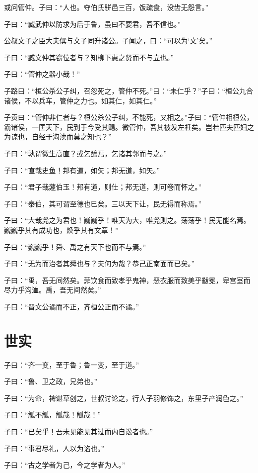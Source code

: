 \documentclass[a5paper]{ctexbook}
\begin{document}
    或问管仲。子曰：“人也。夺伯氏骈邑三百，饭疏食，没齿无怨言。”

    子曰：“臧武仲以防求为后于鲁，虽曰不要君，吾不信也。”

    公叔文子之臣大夫僎与文子同升诸公。子闻之，曰：“可以为‘文’矣。”

    子曰：“臧文仲其窃位者与？知柳下惠之贤而不与立也。”

    子曰：“管仲之器小哉！”

    子路曰：“桓公杀公子纠，召忽死之，管仲不死。”曰：“未仁乎？”子曰：“桓公九合诸侯，不以兵车，管仲之力也。如其仁，如其仁。”

    子贡曰：“管仲非仁者与？桓公杀公子纠，不能死，又相之。”子曰：“管仲相桓公，霸诸侯，一匡天下，民到于今受其赐。微管仲，吾其被发左衽矣。岂若匹夫匹妇之为谅也，自经于沟渎而莫之知也？”

    子曰：“孰谓微生高直？或乞醯焉，乞诸其邻而与之。”

    子曰：“直哉史鱼！邦有道，如矢；邦无道，如矢。”

    子曰：“君子哉蘧伯玉！邦有道，则仕；邦无道，则可卷而怀之。”

    子曰：“泰伯，其可谓至德也已矣。三以天下让，民无得而称焉。”

    子曰：“大哉尧之为君也！巍巍乎！唯天为大，唯尧则之。荡荡乎！民无能名焉。巍巍乎其有成功也，焕乎其有文章！”

    子曰：“巍巍乎！舜、禹之有天下也而不与焉。”

    子曰：“无为而治者其舜也与？夫何为哉？恭己正南面而已矣。”

    子曰：“禹，吾无间然矣。菲饮食而致孝乎鬼神，恶衣服而致美乎黻冕，卑宫室而尽力乎沟洫。禹，吾无间然矣。”

    子曰：“晋文公谲而不正，齐桓公正而不谲。”

    \chapter{世实}

    子曰：“齐一变，至于鲁；鲁一变，至于道。”

    子曰：“鲁、卫之政，兄弟也。”

    子曰：“为命，裨谌草创之，世叔讨论之，行人子羽修饰之，东里子产润色之。”

    子曰：“觚不觚，觚哉！觚哉！”

    子曰：“已矣乎！吾未见能见其过而内自讼者也。”

    子曰：“事君尽礼，人以为谄也。”

    子曰：“古之学者为己，今之学者为人。”
\end{document}
